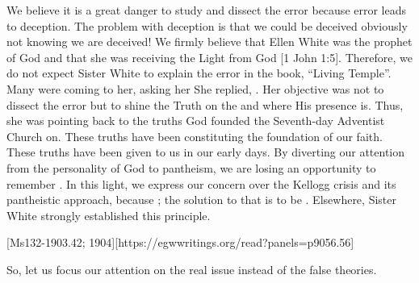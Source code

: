 We believe it is a great danger to study and dissect the error because error leads to deception. The problem with deception is that we could be deceived obviously not knowing we are deceived! We firmly believe that Ellen White was the prophet of God and that she was receiving the Light from God [1 John 1:5]. Therefore, we do not expect Sister White to explain the error in the book, “Living Temple”. Many were coming to her, asking her  She replied, . Her objective was not to dissect the error but to shine the Truth on the  and where His presence is. Thus, she was pointing back to the truths God founded the Seventh-day Adventist Church on. These truths have been constituting the foundation of our faith. These truths have been given to us in our early days. By diverting our attention from the personality of God to pantheism, we are losing an opportunity to remember . In this light, we express our concern over the Kellogg crisis and its pantheistic approach, because ; the solution to that is to be . Elsewhere, Sister White strongly established this principle.

[Ms132-1903.42; 1904][https://egwwritings.org/read?panels=p9056.56]

So, let us focus our attention on the real issue instead of the false theories. 

